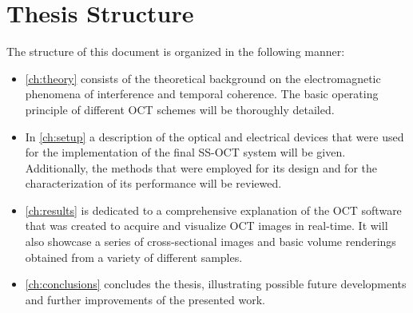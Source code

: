 \section{Thesis Structure}
The structure of this document is organized in the following manner:
\begin{itemize}
	\item \autoref{ch:theory} consists of the theoretical background on the electromagnetic phenomena of interference and temporal coherence. The basic operating principle of different OCT schemes will be thoroughly detailed. 
	\item In \autoref{ch:setup} a description of the optical and electrical devices that were used for the implementation of the final SS-OCT system will be given. Additionally, the methods that were employed for its design and for the characterization of its performance will be reviewed. 
	\item \autoref{ch:results} is dedicated to a comprehensive explanation of the OCT software that was created to acquire and visualize OCT images in real-time. It will also showcase a series of cross-sectional images and basic volume renderings obtained from a variety of different samples. 
	\item \autoref{ch:conclusions} concludes the thesis, illustrating possible future developments and further improvements of the presented work.  
\end{itemize}


% 

% 

% 

